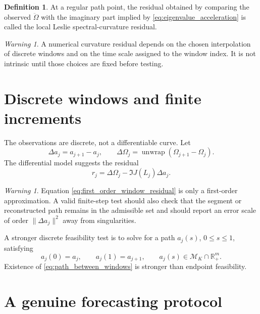 \documentclass[11pt]{amsart}
\numberwithin{equation}{section}
\theoremstyle{plain}
\theoremstyle{definition}
\newtheorem{definition}[theorem]{Definition}
\theoremstyle{remark}
\newtheorem{warning}[theorem]{Warning}
\begin{document}
\begin{definition}
\label{def:spectral_curvature}
At a regular path point, the residual obtained by comparing the observed $\ddot\Omega$ with the imaginary part implied by \eqref{eq:eigenvalue_acceleration} is called the local Leslie spectral-curvature residual.
\end{definition}

\begin{warning}
\label{warn:curvature_not_intrinsic}
A numerical curvature residual depends on the chosen interpolation of discrete windows and on the time scale assigned to the window index.  It is not intrinsic until those choices are fixed before testing.
\end{warning}

\section{Discrete windows and finite increments}
\label{sec:discrete_windows}

The observations are discrete, not a differentiable curve.  Let
\begin{equation}
\Delta a_j=a_{j+1}-a_j,
\qquad
\Delta\Omega_j=\operatorname{unwrap}(\Omega_{j+1}-\Omega_j).
\label{eq:window_increments}
\end{equation}
The differential model suggests the residual
\begin{equation}
r_j
=
\Delta\Omega_j-
\Im J(L_j)\Delta a_j.
\label{eq:first_order_window_residual}
\end{equation}

\begin{warning}
\label{warn:finite_increment}
Equation \eqref{eq:first_order_window_residual} is only a first-order approximation.  A valid finite-step test should also check that the segment or reconstructed path remains in the admissible set and should report an error scale of order $\|\Delta a_j\|^2$ away from singularities.
\end{warning}

A stronger discrete feasibility test is to solve for a path $a_j(s)$, $0\leq s\leq1$, satisfying
\begin{equation}
a_j(0)=a_j,
\qquad
a_j(1)=a_{j+1},
\qquad
a_j(s)\in\mathcal M_K\cap\mathbb R_+^m.
\label{eq:path_between_windows}
\end{equation}
Existence of \eqref{eq:path_between_windows} is stronger than endpoint feasibility.

\section{A genuine forecasting protocol}
\label{sec:forecasting_protocol}
\end{document}
